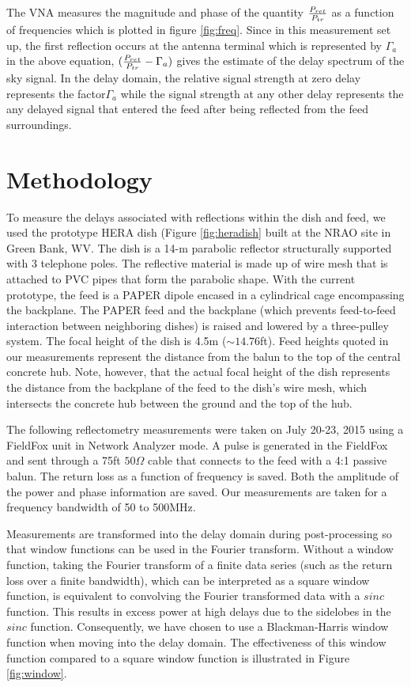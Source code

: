 \documentclass[12pt,preprint]{aastex}
\begin{document}
 
The VNA measures the magnitude and phase of the quantity ${P_{ret}\over P_{tr}}$ as a function of frequencies which is plotted in figure \ref{fig:freq}. Since in this measurement set up, the first reflection occurs at the antenna terminal which is represented by $\Gamma_{a}$ in the above equation, $({P_{ret} \over P_{tr} }  - \Gamma_{a}) $ gives the estimate of the delay spectrum of the sky signal. In the delay domain, the relative signal strength at zero delay represents the factor$\Gamma_{a}$ while the signal strength at any other delay represents the any delayed signal that entered the feed after being reflected from the feed surroundings. 
 
\section{Methodology}{\label{sec:methods}}


To measure the delays associated with reflections within the dish and feed, we
used the prototype HERA dish (Figure \ref{fig:heradish} built at the NRAO site in
Green Bank, WV. The dish is a 14-m parabolic reflector structurally supported
with 3 telephone poles. The reflective material is made up of wire mesh that
is attached to PVC pipes that form the parabolic shape. With the current
prototype, the feed is a PAPER dipole encased in a cylindrical cage encompassing
the backplane. The PAPER feed and the backplane (which prevents feed-to-feed
interaction between neighboring dishes) is raised and lowered by a three-pulley
system. The focal height of the dish is 4.5m ($\sim{14.76}$ft). Feed heights quoted in our measurements represent the distance from the balun to the top of the central concrete hub. Note, however, that the actual focal height of the dish represents the distance from the backplane of the feed to the dish's wire mesh, which intersects the concrete hub between the ground and the top of the hub. 

The following reflectometry measurements were taken on July 20-23, 2015 using a
FieldFox unit in Network Analyzer mode. A pulse is generated in the FieldFox
and sent through a 75ft $50\Omega$ cable that connects to the feed with a 4:1
passive balun. The return loss as a function of frequency is saved. Both
the amplitude of the power and phase information are saved. Our
measurements are taken for a frequency bandwidth of 50 to 500MHz. 

Measurements are transformed into the delay domain during post-processing so that window functions
can be used in the Fourier transform. Without a window function, taking the Fourier transform of a finite data series (such as the return loss over a finite bandwidth), which can be interpreted as a square window function, is equivalent to convolving the Fourier transformed data with a $sinc$ function. This results in excess power at high delays due to the sidelobes in the $sinc$ function. Consequently, we have chosen to use a Blackman-Harris window function when moving into the delay domain. The effectiveness of this window function compared to a square window function is illustrated in Figure \ref{fig:window}.
\end{document}
